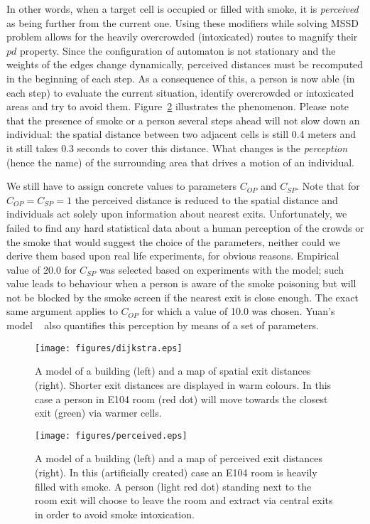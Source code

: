 In other words, when a target cell is occupied or filled with smoke, it is
\emph{perceived} as being further from the current one.
Using these modifiers while solving MSSD problem allows for the heavily 
overcrowded (intoxicated) routes to magnify their $pd$ property.
Since the configuration of automaton is not stationary and the weights of the
edges change dynamically, perceived distances must be recomputed in the
beginning of each step.
As a consequence of this, a person is now able (in each step) to evaluate the 
current situation, identify overcrowded or intoxicated areas and try to avoid
them.
Figure~\ref{fig:perceived} illustrates the phenomenon.
Please note that the presence of smoke or a person several steps ahead will not
slow down an individual: the spatial distance between two adjacent cells is
still 0.4 meters and it still takes 0.3 seconds to cover this distance.
What changes is the \emph{perception} (hence the name) of the surrounding area
that drives a motion of an individual.

We still have to assign concrete values to parameters $C_{OP}$ and $C_{SP}$.
Note that for $C_{OP} = C_{SP} = 1$ the perceived distance is reduced to the
spatial distance and individuals act solely upon information about nearest exits. 
Unfortunately, we failed to find any hard statistical data about a human
perception of the crowds or the smoke that would suggest the choice of the
parameters, neither could we derive them based upon real life experiments, for
obvious reasons. 
Empirical value of 20.0 for $C_{SP}$ was selected based on experiments with the 
model; such value leads to behaviour when a person is aware of the smoke
poisoning but will not be blocked by the smoke screen if the nearest exit is
close enough.
The exact same argument applies to $C_{OP}$ for which a value of 10.0 was chosen.
Yuan's model ~\cite{Yuan} also quantifies this perception by means of a set
of parameters.

\begin{figure}
    \centering
    \texttt{[image: figures/dijkstra.eps]}
    \caption{
        A model of a building (left) and a map of spatial exit distances
        (right).
        Shorter exit distances are displayed in warm colours.
        In this case a person in E104 room (red dot) will move towards the
        closest exit (green) via warmer cells.
    }
    \label{fig:dijkstra}
\end{figure}

\begin{figure}
    \centering
    \texttt{[image: figures/perceived.eps]}
    \caption{
        A model of a building (left) and a map of perceived exit
        distances (right).
        In this (artificially created) case an E104 room is heavily filled with
        smoke.
        A person (light red dot) standing next to the room exit will choose to
        leave the room and extract via central exits in order to avoid smoke
        intoxication.
    }
    \label{fig:perceived}
\end{figure}
 
